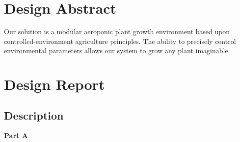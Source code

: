 \documentclass{report}
\begin{document}
\tableofcontents
\newpage

\section{Design Abstract}
Our solution is a modular aeroponic plant growth environment based upon controlled-environment agriculture principles.
The ability to precisely control environmental parameters allows our system to grow any plant imaginable.

\section{Design Report}

\subsection{Description}
\label{sec:description}

\textbf{Part A}
\label{sec:description-a}





\end{document}
